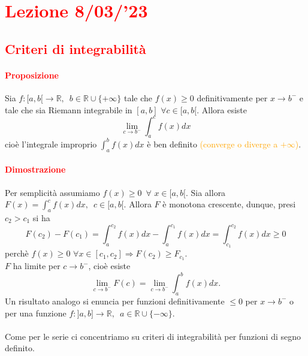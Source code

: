 \documentclass{article}
\newcommand{\R}{\mathbb{R}}
\begin{document}
\newpage
\section{\textcolor{red}{Lezione 8\space{}/03/'23}}
\subsection{\textcolor{red}{Criteri di integrabilità}}
\paragraph{\textcolor{red}{Proposizione}}
Sia $f:[a,b[\rightarrow \R,\,\,\, b\in\R\cup \{+\infty\}$ tale che $f(x)\geq0$ definitivamente per $x \rightarrow b^-$ e tale che sia Riemann integrabile in $[a,b]\,\, \forall c\in [a,b[$. Allora esiste
\begin{equation*}
    \lim_{c \rightarrow b^-} \int_{a}^{c} f(x)dx
\end{equation*}
cioè l'integrale improprio $\int_{a}^{b} f(x)dx$ è ben definito \textcolor{orange}{(converge o diverge a $+\infty$)}.

\paragraph{\textcolor{red}{Dimostrazione}}
Per semplicità assumiamo $f(x)\geq 0 \,\,\, \forall\,\, x\in[a,b[$. Sia allora $F(x)=\int_{a}^{c} f(x)dx,\,\,\,c\in [a,b[$. Allora $F$ è monotona crescente, dunque, presi $c_2 > c_1$ si ha
\begin{equation*}
    F(c_2)-F(c_1)=\int_{a}^{c_2}f(x)dx - \int_{a}^{c_1} f(x)dx = \int_{c_1}^{c_2} f(x)dx \geq 0
\end{equation*}
perchè $f(x)\geq 0 \,\,\forall x \in [c_1,c_2] \Rightarrow F(c_2)\geq F_{c_1}$.\\
$F$ ha limite per $c \rightarrow b^-$, cioè esiste
\begin{equation*}
    \lim_{c \rightarrow b^-} F(c)=\lim_{c \rightarrow b^-} \int_{a}^{b} f(x)dx.
\end{equation*}
Un risultato analogo si enuncia per funzioni definitivamente $\leq 0$ per $ x\rightarrow b^-$ o per una funzione $f:]a,b]\rightarrow \R,\,\,\, a\in\R\cup\{-\infty\}$.
\begin{flushright}
\large\Lightning
\end{flushright}

\paragraph{}
Come per le serie ci concentriamo su criteri di integrabilità per funzioni di segno definito.
\end{document}
